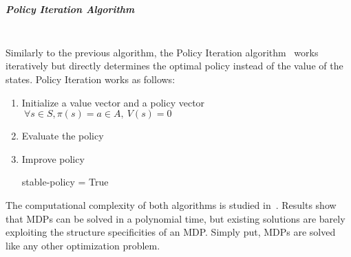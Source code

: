 \textbf{\\}
\subparagraph{Policy Iteration Algorithm}\textbf{\\}
Similarly to the previous algorithm, the Policy Iteration algorithm~\cite{policyiteration} works iteratively but directly determines the optimal policy instead of the value of the states.
Policy Iteration works as follows:
\begin{enumerate}
    \item Initialize a value vector and a policy vector $~\forall s\in S,\pi(s)=a\in A,~V(s)=0$
    \item Evaluate the policy
        \begin{algorithm}
        \end{algorithm}\newpage
    \item Improve policy
    \begin{algorithm}
        stable-policy = True
    \end{algorithm}
\end{enumerate}



The computational complexity of both algorithms is studied in~\cite{mdpcomplexity}.
Results show that MDPs can be solved in a polynomial time, but existing solutions are barely exploiting the structure specificities of an MDP. Simply put, MDPs are solved like any other optimization problem.

